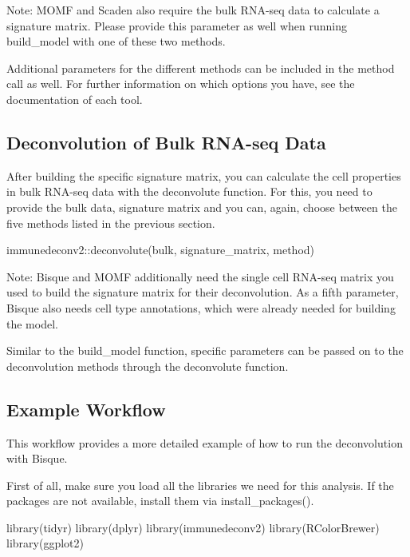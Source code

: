 \documentclass[
]{article}
\newenvironment{Shaded}{\begin{snugshade}}{\end{snugshade}}
\newcommand{\FunctionTok}[1]{\textcolor[rgb]{0.00,0.00,0.00}{#1}}
\newcommand{\NormalTok}[1]{#1}
\newcommand{\SpecialCharTok}[1]{\textcolor[rgb]{0.00,0.00,0.00}{#1}}
\begin{document}
Note: MOMF and Scaden also require the bulk RNA-seq data to calculate a
signature matrix. Please provide this parameter as well when running
build\_model with one of these two methods.

Additional parameters for the different methods can be included in the
method call as well. For further information on which options you have,
see the documentation of each tool.

\hypertarget{deconvolution-of-bulk-rna-seq-data}{%
\subsection{Deconvolution of Bulk RNA-seq
Data}\label{deconvolution-of-bulk-rna-seq-data}}

After building the specific signature matrix, you can calculate the cell
properties in bulk RNA-seq data with the deconvolute function. For this,
you need to provide the bulk data, signature matrix and you can, again,
choose between the five methods listed in the previous section.

\begin{Shaded}
\begin{Highlighting}[]
\NormalTok{immunedeconv2}\SpecialCharTok{::}\FunctionTok{deconvolute}\NormalTok{(bulk, signature\_matrix, method)}
\end{Highlighting}
\end{Shaded}

Note: Bisque and MOMF additionally need the single cell RNA-seq matrix
you used to build the signature matrix for their deconvolution. As a
fifth parameter, Bisque also needs cell type annotations, which were
already needed for building the model.

Similar to the build\_model function, specific parameters can be passed
on to the deconvolution methods through the deconvolute function.

\hypertarget{example-workflow}{%
\subsection{Example Workflow}\label{example-workflow}}

This workflow provides a more detailed example of how to run the
deconvolution with Bisque.

First of all, make sure you load all the libraries we need for this
analysis. If the packages are not available, install them via
install\_packages().

\begin{Shaded}
\begin{Highlighting}[]
\FunctionTok{library}\NormalTok{(tidyr)}
\FunctionTok{library}\NormalTok{(dplyr)}
\FunctionTok{library}\NormalTok{(immunedeconv2)}
\FunctionTok{library}\NormalTok{(RColorBrewer)}
\FunctionTok{library}\NormalTok{(ggplot2)}
\end{Highlighting}
\end{Shaded}
\end{document}
